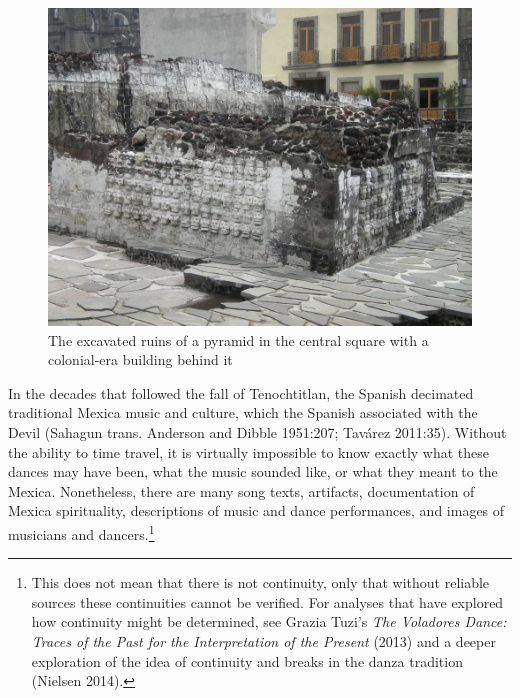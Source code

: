\documentclass[twoside]{article}
\begin{document}
\begin{figure}[htb]
  \includegraphics[width=\textwidth]{nielsen-fig2.jpg}
  \caption{The excavated ruins of a pyramid in the central square with a colonial-era building behind it}
\end{figure}

In the decades that followed the fall of Tenochtitlan, the Spanish
decimated traditional Mexica music and culture, which the Spanish
associated with the Devil (Sahagun trans. Anderson and Dibble 1951:207;
Tavárez 2011:35). Without the ability to time travel, it is virtually
impossible to know exactly what these dances may have been, what the
music sounded like, or what they meant to the Mexica. Nonetheless, there
are many song texts, artifacts, documentation of Mexica spirituality,
descriptions of music and dance performances, and images of musicians
and dancers.\footnote{This does not mean that there is not continuity,
  only that without reliable sources these continuities cannot be
  verified. For analyses that have explored how continuity might be
  determined, see Grazia Tuzi's \emph{The Voladores Dance: Traces of the
  Past for the Interpretation of the Present} (2013) and a deeper
  exploration of the idea of continuity and breaks in the danza
  tradition (Nielsen 2014).}
\end{document}
